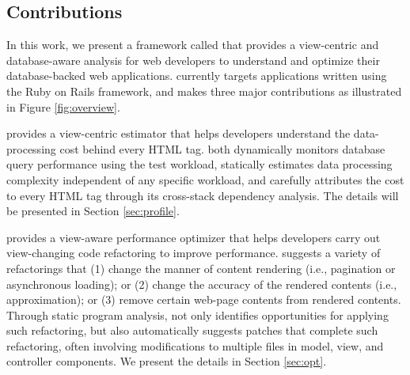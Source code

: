 
\subsection{Contributions}
In this work, we present a framework called \Tool that provides a view-centric 
and database-aware analysis
for web developers to understand and optimize 
their database-backed web applications. \Tool currently targets applications  written using the Ruby on Rails framework, and makes three major contributions as illustrated in Figure \ref{fig:overview}.

\Tool provides a view-centric estimator that helps developers understand the 
data-processing cost behind every HTML tag. 
\Tool both dynamically monitors database query performance using the test workload, statically estimates data processing complexity independent of any specific workload, and carefully attributes the cost to every HTML tag
through its cross-stack dependency analysis. The details will be presented in 
Section \ref{sec:profile}.

\Tool provides a view-aware performance optimizer that helps developers carry out
view-changing code refactoring to improve performance. \Tool suggests a variety
of refactorings that (1) change the manner of content rendering (i.e., pagination or asynchronous loading);
or (2) change the accuracy of the rendered contents (i.e., approximation);
or (3) remove certain web-page contents from rendered contents. Through static program
analysis, \Tool not only identifies opportunities for applying such refactoring,
but also automatically suggests patches that complete such refactoring,
often involving modifications to multiple files in model, view, and controller components.
We present the details in Section \ref{sec:opt}.


